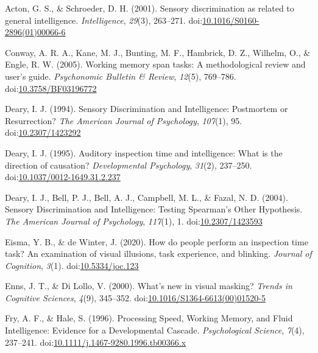 \documentclass[
  ,man]{apa6}
\newlength{\cslhangindent}
\newenvironment{CSLReferences}[2] %
 {\begin{list}{}{%
  \setlength{\itemindent}{0pt}
  \setlength{\leftmargin}{0pt}
  \setlength{\parsep}{0pt}
  \ifodd #1
   \setlength{\leftmargin}{\cslhangindent}
   \setlength{\itemindent}{-1\cslhangindent}
  \fi
  \setlength{\itemsep}{#2\baselineskip}}}
 {\end{list}}
\begin{document}
\label{refs}
\begin{CSLReferences}{1}{0}
Acton, G. S., \& Schroeder, D. H. (2001). Sensory discrimination as related to general intelligence. \emph{Intelligence}, \emph{29}(3), 263--271. doi:\href{https://doi.org/10.1016/S0160-2896(01)00066-6}{10.1016/S0160-2896(01)00066-6}

Conway, A. R. A., Kane, M. J., Bunting, M. F., Hambrick, D. Z., Wilhelm, O., \& Engle, R. W. (2005). Working memory span tasks: {A} methodological review and user's guide. \emph{Psychonomic Bulletin \& Review}, \emph{12}(5), 769--786. doi:\href{https://doi.org/10.3758/BF03196772}{10.3758/BF03196772}

Deary, I. J. (1994). Sensory {Discrimination} and {Intelligence}: {Postmortem} or {Resurrection}? \emph{The American Journal of Psychology}, \emph{107}(1), 95. doi:\href{https://doi.org/10.2307/1423292}{10.2307/1423292}

Deary, I. J. (1995). Auditory inspection time and intelligence: {What} is the direction of causation? \emph{Developmental Psychology}, \emph{31}(2), 237--250. doi:\href{https://doi.org/10.1037/0012-1649.31.2.237}{10.1037/0012-1649.31.2.237}

Deary, I. J., Bell, P. J., Bell, A. J., Campbell, M. L., \& Fazal, N. D. (2004). Sensory {Discrimination} and {Intelligence}: {Testing Spearman}'s {Other Hypothesis}. \emph{The American Journal of Psychology}, \emph{117}(1), 1. doi:\href{https://doi.org/10.2307/1423593}{10.2307/1423593}

Eisma, Y. B., \& de Winter, J. (2020). How do people perform an inspection time task? {An} examination of visual illusions, task experience, and blinking. \emph{Journal of Cognition}, \emph{3}(1). doi:\href{https://doi.org/10.5334/joc.123}{10.5334/joc.123}

Enns, J. T., \& Di Lollo, V. (2000). What's new in visual masking? \emph{Trends in Cognitive Sciences}, \emph{4}(9), 345--352. doi:\href{https://doi.org/10.1016/S1364-6613(00)01520-5}{10.1016/S1364-6613(00)01520-5}

Fry, A. F., \& Hale, S. (1996). Processing {Speed}, {Working Memory}, and {Fluid Intelligence}: {Evidence} for a {Developmental Cascade}. \emph{Psychological Science}, \emph{7}(4), 237--241. doi:\href{https://doi.org/10.1111/j.1467-9280.1996.tb00366.x}{10.1111/j.1467-9280.1996.tb00366.x}


\end{CSLReferences}
\end{document}
